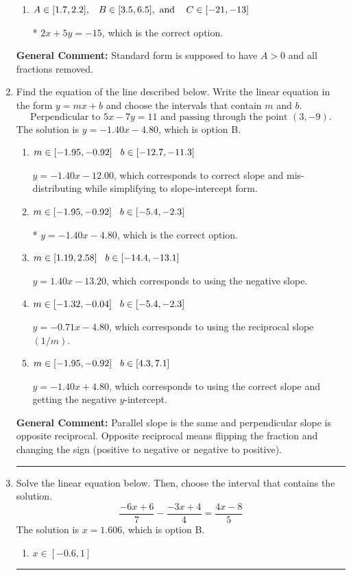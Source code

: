\documentclass{extbook}[14pt]
\newcommand{\litem}[1]{\item #1

\rule{\textwidth}{0.4pt}}
\begin{document}
\begin{enumerate}
{\begin{enumerate}[label=\Alph*.]
 $2x - 5y = 15$, which corresponds to using the opposite (negative) slope of the graph, but did everything else correctly.
\item \( A \in [1.7, 2.2], \hspace{3mm} B \in [3.5, 6.5], \text{ and } \hspace{3mm} C \in [-21, -13] \)

* $2x + 5y = -15$, which is the correct option.
\end{enumerate}

\textbf{General Comment:} Standard form is supposed to have $A > 0$ and all fractions removed.
}
\litem{
Find the equation of the line described below. Write the linear equation in the form $ y=mx+b $ and choose the intervals that contain $m$ and $b$.
\[ \text{Perpendicular to } 5 x - 7 y = 11 \text{ and passing through the point } (3, -9). \]The solution is \( y = -1.40x - 4.80 \), which is option B.\begin{enumerate}[label=\Alph*.]
\item \( m \in [-1.95, -0.92] \hspace*{3mm} b \in [-12.7, -11.3] \)

 $y = -1.40x - 12.00$, which corresponds to correct slope and mis-distributing while simplifying to slope-intercept form.
\item \( m \in [-1.95, -0.92] \hspace*{3mm} b \in [-5.4, -2.3] \)

* $y = -1.40x - 4.80$, which is the correct option.
\item \( m \in [1.19, 2.58] \hspace*{3mm} b \in [-14.4, -13.1] \)

 $y = 1.40x - 13.20$, which corresponds to using the negative slope.
\item \( m \in [-1.32, -0.04] \hspace*{3mm} b \in [-5.4, -2.3] \)

 $y = -0.71x - 4.80$, which corresponds to using the reciprocal slope $(1/m)$.
\item \( m \in [-1.95, -0.92] \hspace*{3mm} b \in [4.3, 7.1] \)

 $y = -1.40x + 4.80$, which corresponds to using the correct slope and getting the negative $y$-intercept.
\end{enumerate}

\textbf{General Comment:} Parallel slope is the same and perpendicular slope is opposite reciprocal. Opposite reciprocal means flipping the fraction and changing the sign (positive to negative or negative to positive).
}
\litem{
Solve the linear equation below. Then, choose the interval that contains the solution.
\[ \frac{-6x + 6}{7} - \frac{-3x + 4}{4} = \frac{4x -8}{5} \]The solution is \( x = 1.606 \), which is option B.\begin{enumerate}[label=\Alph*.]
\item \( x \in [-0.6, 1] \)


\end{enumerate}}
\end{enumerate}
\end{document}

